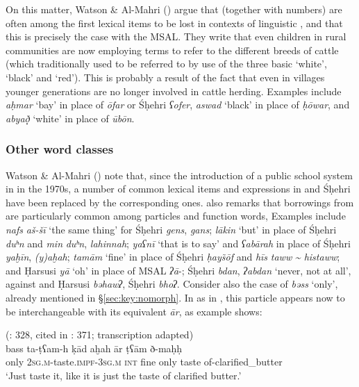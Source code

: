 \documentclass[output=paper]{langsci/langscibook}
\begin{document}
On this matter, Watson \& Al-Mahri (\citeyear[90]{WatsonAl-Mahri2017}) argue that  (together with numbers) are often among the first lexical items to be lost in contexts of linguistic , and that this is precisely the case with the MSAL. They write that even children in rural communities are now employing  terms to refer to the different breeds of cattle (which traditionally used to be referred to by use of the three basic  ‘white’, ‘black’ and ‘red’). This is probably a result of the fact that even in villages younger generations are no longer involved in cattle herding. Examples include \textit{aḥmar} ‘bay’ in place of  \textit{ōfar} or Śḥehri \textit{ʕofer}, \textit{aswad} ‘black’ in place of  \textit{ḥōwar}, and \textit{abya\d{ð}}̣ ‘white’ in place of  \textit{ūbōn}.


 \subsubsection{Other word classes}

Watson \& Al-Mahri (\citeyear[90]{WatsonAl-Mahri2017}) note that, since the introduction of a public school system in  in the 1970s, a number of common lexical items and expressions in  and Śḥehri have been replaced by the corresponding  ones. \citet{Lonnet2011} also remarks that borrowings from  are particularly common among particles and function words, Examples include \textit{nafs} \textit{aš-šī} ‘the same thing’ for Śḥehri \textit{gens},  \textit{gans}; \textit{lākin} ‘but’ in place of Śḥehri \textit{duʰn} and \textit{min} \textit{duʰn},  \textit{lahinnah}; \textit{yaʕnī} ‘that is to say’ and \textit{ʕabārah} in place of Śḥehri \textit{yaḫīn},  \textit{(y)aḫah}; \textit{tamām} ‘fine’ in place of Śḥehri \textit{ḥay\~{s}ōf} and  \textit{hīs} \textit{taww} \textit{{\textasciitilde} histaww};  and Ḥarsusi  \textit{yā} ‘oh’ in place of MSAL \textit{ʔā}-; Śḥehri \textit{bdan},  \textit{ʔabdan} ‘never, not at all’, against  and Ḥarsusi \textit{bəhawʔ}, Śḥehri \textit{bhoʔ}. Consider also the case of  \textit{bəss} ‘only’, already mentioned in §\ref{sec:key:nomorph}. In  as in , this particle appears now to be interchangeable with its equivalent \textit{ār}, as example  shows:

\ea\label{ex:key:sima}
{ (\citealt{Sima2009}: 328, cited in \citealt{Watson2012}: 371; transcription adapted)}\\
\gll bass ta-ṭʕam-h ḳād aḫah ār ṭʕām ð-maḥḥ\\
     only 2\textsc{sg.m}-taste.\textsc{impf-3sg.m} \textsc{int} fine only taste of-clarified\_butter\\
\glt `Just taste it, like it is just the taste of clarified butter.' 
\z
\end{document}

